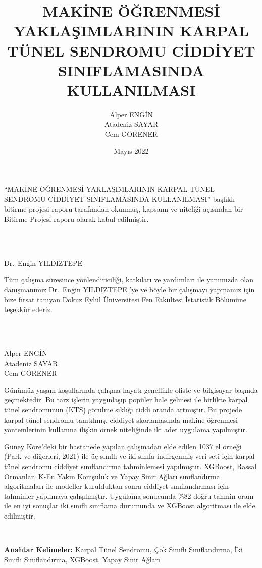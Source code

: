\documentclass[12pt,twoside]{deuthesis}
\title{MAKİNE ÖĞRENMESİ YAKLAŞIMLARININ KARPAL TÜNEL SENDROMU CİDDİYET SINIFLAMASINDA KULLANILMASI}
\author{Alper ENGİN \\ Atadeniz SAYAR \\ Cem GÖRENER} %
\date{Mayıs 2022}
\begin{document}
  \maketitle

\frontmatter %
\pagestyle{empty} %
\begin{preface}
	``MAKİNE ÖĞRENMESİ YAKLAŞIMLARININ KARPAL TÜNEL SENDROMU CİDDİYET SINIFLAMASINDA KULLANILMASI'' başlıklı bitirme projesi raporu tarafımdan okunmuş, kapsamı ve niteliği açısından bir Bitirme Projesi raporu olarak kabul edilmiştir.\\
 \strut \\
 \strut \\
 Dr.~Engin YILDIZTEPE
\end{preface}
  \begin{acknowledgements}
    Tüm çalışma süresince yönlendiriciliği, katkıları ve yardımları ile yanımızda olan danışmanımız Dr.~Engin YILDIZTEPE 'ye ve böyle bir çalışmayı yapmamız için bize fırsat tanıyan Dokuz Eylül Üniversitesi Fen Fakültesi İstatistik Bölümüne teşekkür ederiz.\\
    \strut \\
    \strut \\
    Alper ENGİN\\
    Atadeniz SAYAR\\
    Cem GÖRENER\\
  \end{acknowledgements}
\begin{abstractTR}
	Günümüz yaşam koşullarında çalışma hayatı genellikle ofiste ve bilgisayar başında geçmektedir. Bu tarz işlerin yaygınlaşıp popüler hale gelmesi ile birlikte karpal tünel sendromunun (KTS) görülme sıklığı ciddi oranda artmıştır. Bu projede karpal tünel sendromu tanıtılmış, ciddiyet skorlamasında makine öğrenmesi yöntemlerinin kullanına ilişkin örnek niteliğinde iki adet uygulama yapılmıştır.\\
 \hspace*{0.333em}

 \par

 Güney Kore'deki bir hastanede yapılan çalışmadan elde edilen 1037 el örneği (Park ve diğerleri, 2021) ile üç sınıflı ve iki sınıfa indirgenmiş veri seti için karpal tünel sendromu ciddiyet sınıflandırma tahminlemesi yapılmıştır. XGBoost, Rassal Ormanlar, K-En Yakın Komşuluk ve Yapay Sinir Ağları sınıflandırma algoritmaları ile modeller kurulduktan sonra ciddiyet sınıflandırması için tahminler yapılmaya çalışılmıştır. Uygulama sonucunda \%82 doğru tahmin oranı ile en iyi sonuçlar iki sınıflı sınıflama durumunda ve XGBoost algoritması ile elde edilmiştir.

 ~

 \textbf{Anahtar Kelimeler:} Karpal Tünel Sendromu, Çok Sınıflı Sınıflandırma, İki Sınıflı Sınıflandırma, XGBoost, Yapay Sinir Ağları
\end{abstractTR}
\end{document}
